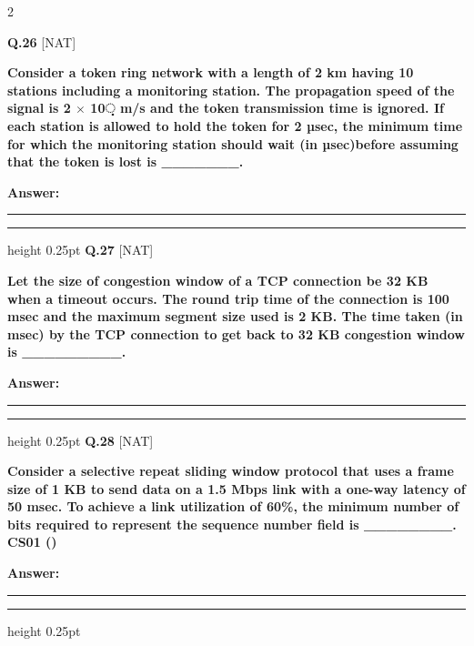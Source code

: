 \documentclass[a4paper,10pt,twoside]{article}
\begin{document}
\begin{multicols}{2}
\vspace{6pt}
\vspace{3pt}

\noindent\textbf{Q.26} \hfill {\footnotesize\textsf{[NAT]}}
\par\vspace{2pt}
{\bfseries Consider a token ring network with a length of 2 km having 10 stations including a monitoring
station. The propagation speed of the signal is 2 $\times$ 10଼ m/s and the token transmission time is
ignored. If each station is allowed to hold the token for 2 µsec, the minimum time for which the
monitoring station should wait (in µsec)before assuming that the token is lost is \_\_\_\_\_\_\_. \par}
\par\vspace{3pt}\noindent\textbf{Answer:} \rule{3.2cm}{0.4pt}
\par\vspace{6pt}\hrule height 0.25pt\vspace{6pt}
\noindent\textbf{Q.27} \hfill {\footnotesize\textsf{[NAT]}}
\par\vspace{2pt}
{\bfseries Let the size of congestion window of a TCP connection be 32 KB when a timeout occurs. The round
trip time of the connection is 100 msec and the maximum segment size used is 2 KB. The time taken
(in msec) by the TCP connection to get back to 32 KB congestion window is \_\_\_\_\_\_\_\_\_. \par}
\par\vspace{3pt}\noindent\textbf{Answer:} \rule{3.2cm}{0.4pt}
\par\vspace{6pt}\hrule height 0.25pt\vspace{6pt}
\noindent\textbf{Q.28} \hfill {\footnotesize\textsf{[NAT]}}
\par\vspace{2pt}
{\bfseries Consider a selective repeat sliding window protocol that uses a frame size of 1 KB to send data on a
1.5 Mbps link with a one-way latency of 50 msec. To achieve a link utilization of 60\%, the
minimum number of bits required to represent the sequence number field is \_\_\_\_\_\_\_\_.
CS01 () \par}
\par\vspace{3pt}\noindent\textbf{Answer:} \rule{3.2cm}{0.4pt}
\par\vspace{6pt}\hrule height 0.25pt\vspace{6pt}

\end{multicols}
\end{document}
